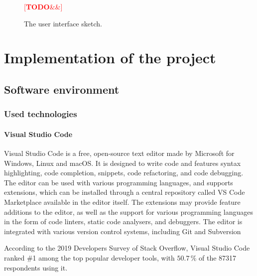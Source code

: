 \documentclass[english,engineering]{wizthesis}
\newcommand{\todo}[1]{%
  \textcolor{red}{[\textbf{TODO}\ifx&#1&{}\else{ }\fi\emph{#1}]}%
}
\begin{document}
\begin{figure}[H]
  \centering
  \todo{}
  \caption{The user interface sketch.}
  \label{fig:interface-prototype}
\end{figure}

\chapter{Implementation of the project} \label{ch:implementation-of-the-project}

\section{Software environment}

\subsection{Used technologies} \label{sbs:used-technologies}

\subsubsection*{Visual Studio Code}

Visual Studio Code \cite{vs-code} is a free, open-source text editor made by
Microsoft for Windows, Linux and macOS. It is designed to write code and
features syntax highlighting, code completion, snippets, code refactoring, and
code debugging. The editor can be used with various programming languages, and
supports extensions, which can be installed through a central repository called
VS Code Marketplace available in the editor itself. The extensions may provide
feature additions to the editor, as well as the support for various programming
languages in the form of code linters, static code analysers, and debuggers. The
editor is integrated with various version control systems, including Git and
Subversion

According to the 2019 Developers Survey of Stack Overflow, Visual Studio Code
ranked \#1 among the top popular developer tools, with $50.7\,\%$ of the 87317
respondents using it. \cite{stack-overflow-insights-2019}
\end{document}
